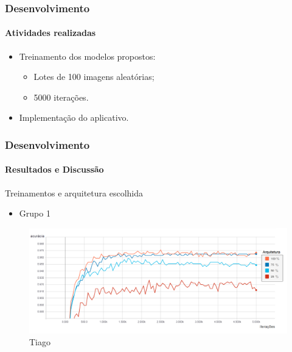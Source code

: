 \documentclass{beamer}
\begin{document}
    \begin{frame}
      \frametitle{Desenvolvimento}
      \framesubtitle{Atividades realizadas}      
      \begin{itemize}
        \item<1-> Treinamento dos modelos propostos: \medskip
		 \begin{itemize}
        		\item<2-> Lotes de 100 imagens aleatórias; \medskip
        		\item<3-> 5000 iterações. \bigskip
		\end{itemize}        
        \item<4-> Implementação do aplicativo.
      \end{itemize}
    \end{frame}
        
    
    \begin{frame}
      \frametitle{Desenvolvimento}
      \framesubtitle{Resultados e Discussão}  \medskip  
      	Treinamentos e arquitetura escolhida \medskip    
      	\begin{itemize}
      		\item Grupo 1
		\end{itemize}      	  	
		\begin{figure}[t]
      		 \begin{minipage}[h]{1.0\linewidth}
         		\centering
      			\includegraphics[height=0.42\linewidth]{img/acc_1_5000.png}
      			\caption{Tiago}
      		\end{minipage}
      		\vspace{0.00mm}
      	\end{figure}	      	       
    \end{frame}
    
\end{document}
